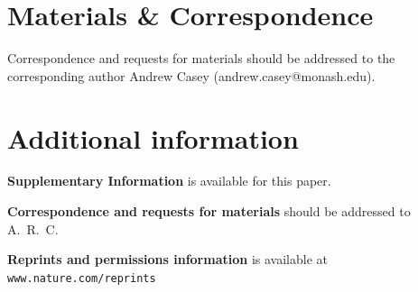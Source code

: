 \documentclass[a4paper,12pt]{article}
\begin{document}
\section*{Materials \& Correspondence}
Correspondence and requests for materials should be addressed to the corresponding author Andrew Casey (andrew.casey@monash.edu).

\section*{Additional information}

\textbf{Supplementary Information} is available for this paper.

\noindent\textbf{Correspondence and requests for materials} should be addressed to A.~R.~C.

\noindent\textbf{Reprints and permissions information} is available at {\tt\small www.nature.com/reprints}
\end{document}
